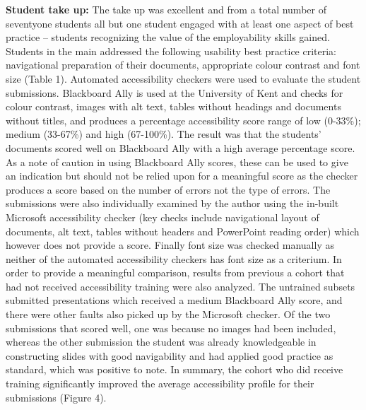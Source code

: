 \documentclass[11.5pt]{sig-alternate} %
\begin{document}
\begin{large}
\textbf{Student take up:} The take up was excellent and from a total number of seventyone students all but one student engaged with at least one aspect of best practice – students recognizing the value of the employability skills gained. Students in the main addressed the following usability best practice criteria: navigational preparation of their documents, appropriate colour contrast and font size (Table 1). Automated accessibility checkers were used to evaluate the student submissions. Blackboard Ally is used at the University of Kent and checks for colour contrast, images with alt text, tables without headings and documents without titles, and produces a percentage accessibility score range of low (0-33\%); medium (33-67\%) and high (67-100\%). The result was that the students’ documents scored well on Blackboard Ally with a high average percentage score. As a note of caution in using Blackboard Ally scores, these can be used to give an indication but should not be relied upon for a meaningful score as the checker produces a score based on the number of errors not the type of errors. The submissions were also individually examined by the author using the in-built Microsoft accessibility checker (key checks include navigational layout of documents, alt text, tables without headers and PowerPoint reading order) which however does not provide a score. Finally font size was checked manually as neither of the automated accessibility checkers has font size as a criterium. In order to provide a meaningful comparison, results from previous a cohort that had not received accessibility training were also analyzed. The untrained subsets submitted presentations which received a medium Blackboard Ally score, and there were other faults also picked up by the Microsoft checker. Of the two submissions that scored well, one was because no images had been included, whereas the other submission the student was already knowledgeable in constructing slides with good navigability and had applied good practice as standard, which was positive to note. In summary, the cohort who did receive training significantly improved the average accessibility profile for their submissions (Figure 4). 


\end{large}
\end{document}
